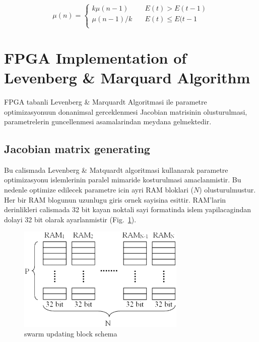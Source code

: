 \documentclass[]{interact}
\theoremstyle{plain}%
\theoremstyle{definition}
\theoremstyle{remark}
\begin{document}
 
\begin{equation}
\label{eq:mu}
 \mu (n) = 
   \begin{cases}
    k\mu(n-1)  & \quad E(t) > E(t-1)\\
   \mu(n-1)/k  & \quad E(t) \leq E(t-1\\
  \end{cases}
\end{equation}

\section{FPGA Implementation of Levenberg \& Marquard Algorithm}
FPGA tabanli Levenberg \& Marquardt Algoritmasi ile parametre optimizasyonuun donanimsal gerceklenmesi Jacobian matrisinin olusturulmasi, parametrelerin guncellenmesi asamalarindan meydana gelmektedir.

\subsection{Jacobian matrix generating}

Bu calismada Levenberg \& Matquardt algoritmasi kullanarak parametre optimizasyonu islemlerinin paralel mimaride kosturulmasi amaclanmistir. Bu nedenle optimize edilecek parametre icin ayri RAM bloklari ($N$) olusturulmustur. Her bir RAM blogunun uzunlugu giris ornek sayisina esittir. RAM’larin derinlikleri calismada 32 bit kayan noktali sayi formatinda islem yapilacagindan dolayi 32 bit olarak ayarlanmistir (Fig.~\ref{fig:jacobian}).

\begin{figure}[h]
  \centering
  \includegraphics[width=8cm]{Jacobian}

  \caption{swarm updating block schema}
  \label{fig:jacobian}
\end{figure}
\end{document}
